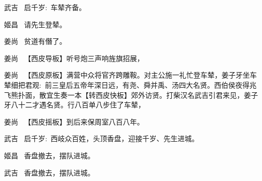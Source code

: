 {\textrm{武吉\hspace{30pt}~ 启千岁:~车辇齐备。}

\textrm{姬昌\hspace{30pt}~ 请先生登辇。}

\textrm{姜尚\hspace{30pt}~ 贫道有僭了。}

\textrm{姜尚\hspace{30pt}~ 【{\akai 西皮导板}】听号炮三声响旌旗招展，}

\setlength{\hangindent}{60pt}   %
{\textrm{姜尚\hspace{30pt}~ 【{\akai 西皮原板}】满营中众将官齐跨雕鞍。对主公施一礼忙登车辇，姜子牙坐车辇细把君观:~前三皇后五帝年深日远，有尧、舜并禹、汤四大名贤。西伯侯夜得兆飞熊扑面，散宜生奏一本【{\footnotesize 转}{\akai 西皮快板}】郊外访贤。打柴汉名武吉引君来见，姜子牙八十二才遇名贤。行八百单八步住了车辇，}}

\textrm{姜尚\hspace{30pt}~ 【{\akai 西皮摇板}】到后来保周室八百八年。}

\textrm{武吉\hspace{30pt}~ 启千岁:~西岐众百姓，头顶香盘，迎接千岁、先生进城。}

\textrm{姬昌\hspace{30pt}~ 香盘撤去，摆队进城。}

\textrm{武吉\hspace{30pt}~ 香盘撤去，摆队进城。}
}

